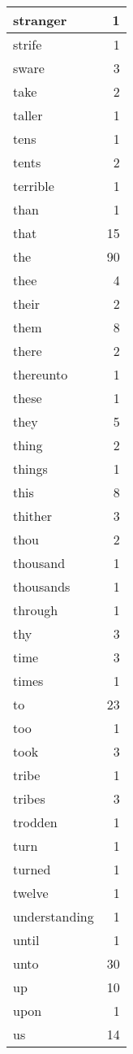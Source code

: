 \begin{center}
\begin{longtable}{l|r}
stranger & 1 \\ \hline
strife & 1 \\ \hline
sware & 3 \\ \hline
take & 2 \\ \hline
taller & 1 \\ \hline
tens & 1 \\ \hline
tents & 2 \\ \hline
terrible & 1 \\ \hline
than & 1 \\ \hline
that & 15 \\ \hline
the & 90 \\ \hline
thee & 4 \\ \hline
their & 2 \\ \hline
them & 8 \\ \hline
there & 2 \\ \hline
thereunto & 1 \\ \hline
these & 1 \\ \hline
they & 5 \\ \hline
thing & 2 \\ \hline
things & 1 \\ \hline
this & 8 \\ \hline
thither & 3 \\ \hline
thou & 2 \\ \hline
thousand & 1 \\ \hline
thousands & 1 \\ \hline
through & 1 \\ \hline
thy & 3 \\ \hline
time & 3 \\ \hline
times & 1 \\ \hline
to & 23 \\ \hline
too & 1 \\ \hline
took & 3 \\ \hline
tribe & 1 \\ \hline
tribes & 3 \\ \hline
trodden & 1 \\ \hline
turn & 1 \\ \hline
turned & 1 \\ \hline
twelve & 1 \\ \hline
understanding & 1 \\ \hline
until & 1 \\ \hline
unto & 30 \\ \hline
up & 10 \\ \hline
upon & 1 \\ \hline
us & 14 \\ \hline

\end{longtable}
\end{center}
